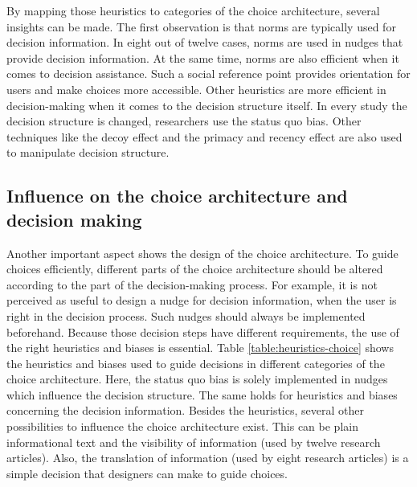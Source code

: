 By mapping those heuristics to categories of the choice architecture, several insights can be made. The first observation is that norms are typically used for decision information. In eight out of twelve cases, norms are used in nudges that provide decision information. At the same time, norms are also efficient when it comes to decision assistance. Such a social reference point provides orientation for users and make choices more accessible. 
Other heuristics are more efficient in decision-making when it comes to the decision structure itself. In every study the decision structure is changed, researchers use the status quo bias.
Other techniques like the decoy effect and the primacy and recency effect are also used to manipulate decision structure.



\subsection{Influence on the choice architecture and decision making}


Another important aspect shows the design of the choice architecture. To guide choices efficiently, different parts of the choice architecture should be altered according to the part of the decision-making process. For example, it is not perceived as useful to design a nudge for decision information, when the user is right in the decision process. Such nudges should always be implemented beforehand. Because those decision steps have different requirements, the use of the right heuristics and biases is essential. Table \ref{table:heuristics-choice} shows the heuristics and biases used to guide decisions in different categories of the choice architecture. Here, the status quo bias is solely implemented in nudges which influence the decision structure. The same holds for heuristics and biases concerning the decision information. Besides the heuristics, several other possibilities to influence the choice architecture exist. This can be plain informational text and the visibility of information (used by twelve research articles). Also, the translation of information (used by eight research articles) is a simple decision that designers can make to guide choices. 

